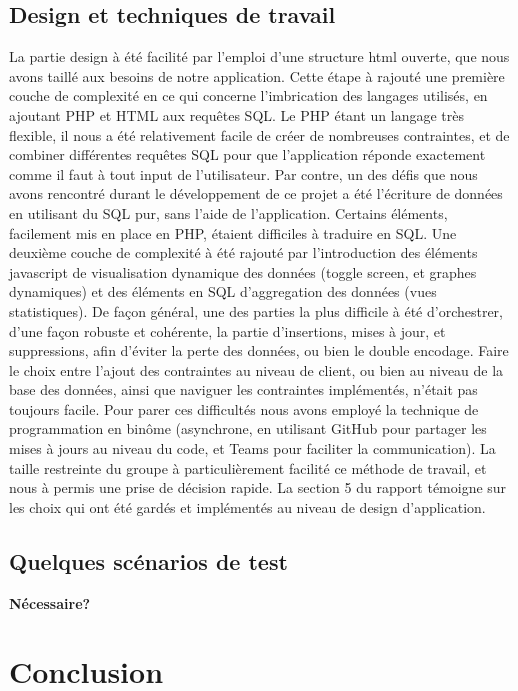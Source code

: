\documentclass[a4paper,12pt]{article}
\begin{document}
\subsection{Design et techniques de travail }

La partie design à été facilité par l'emploi d'une structure html ouverte, que nous avons taillé aux besoins de notre application. Cette étape à rajouté une première couche de complexité en ce qui concerne l'imbrication des langages utilisés, en ajoutant PHP et HTML aux requêtes SQL. Le PHP étant un langage très flexible, il nous a été relativement facile de créer de nombreuses contraintes, et de combiner différentes requêtes SQL pour que l'application réponde exactement comme il faut à tout input de l'utilisateur. 
Par contre, un des défis que nous avons rencontré durant le développement de ce projet a été l'écriture de données en utilisant du SQL pur, sans l'aide de l'application. Certains éléments, facilement mis en place en PHP, étaient difficiles à traduire en SQL.
Une deuxième couche de complexité à été rajouté par l'introduction des éléments javascript de visualisation dynamique des données (toggle screen, et graphes dynamiques) et des éléments en SQL d'aggregation des données (vues statistiques). De façon général, une des parties la plus difficile à été d'orchestrer, d'une façon robuste et cohérente, la partie d'insertions, mises à jour, et suppressions, afin d'éviter la perte des données, ou bien le double encodage. Faire le choix entre l'ajout des contraintes au niveau de client, ou bien au niveau de la base des données, ainsi que naviguer les contraintes implémentés, n'était pas toujours facile. Pour parer ces difficultés nous avons employé la technique de programmation en binôme (asynchrone, en utilisant GitHub pour partager les mises à jours au niveau du code, et Teams pour faciliter la communication). La taille restreinte du groupe à particulièrement facilité ce méthode de travail, et nous à permis une prise de décision rapide.
La section 5 du rapport témoigne sur les choix qui ont été gardés et implémentés au niveau de design d'application.

\subsection{Quelques scénarios de test }

\textbf{Nécessaire?}

\newpage
\section{Conclusion}
\end{document}
